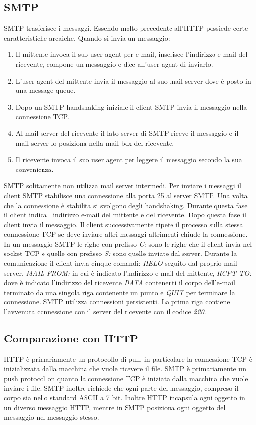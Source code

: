 \subsection{SMTP}
SMTP trasferisce i messaggi. Essendo molto precedente all'HTTP possiede certe caratteristiche arcaiche. Quando si invia un messaggio:
\begin{enumerate}
\item Il mittente invoca il suo user agent per e-mail, inserisce l'indirizzo e-mail del ricevente, compone un messaggio e dice all'user agent di inviarlo.
\item L'user agent del mittente invia il messaggio al suo mail server dove \`e posto in una message queue.
\item Dopo un SMTP handshaking iniziale il client SMTP invia il messaggio nella connessione TCP.
\item Al mail server del ricevente il lato server di SMTP riceve il messaggio e il mail server lo posiziona nella mail box del ricevente.
\item Il ricevente invoca il suo user agent per leggere il messaggio secondo la sua convenienza.
\end{enumerate}
SMTP solitamente non utilizza mail server intermedi. Per inviare i messaggi il client SMTP stabilisce una connessione alla porta 25 al server SMTP. Una volta che la connessione \`e stabilita si svolgono degli 
handshaking. Durante questa fase il client indica l'indirizzo e-mail del mittente e del ricevente. Dopo questa fase il client invia il messaggio. Il client successivamente ripete il processo sulla stessa connessione 
TCP se deve inviare altri messaggi altrimenti chiude la connessione. In un messaggio SMTP le righe con prefisso \emph{C:} sono le righe che il client invia nel socket TCP e quelle con prefisso \emph{S:} sono
quelle inviate dal server. Durante la comunicazione il client invia cinque comandi: \emph{HELO} seguito dal proprio mail server, \emph{MAIL FROM:} in cui \`e indicato l'indirizzo e-mail del mittente, 
\emph{RCPT TO:} dove \`e indicato l'indirizzo del ricevente \emph{DATA} contenenti il corpo dell'e-mail terminato da una singola riga contenente un punto e \emph{QUIT} per terminare la connessione. SMTP
utilizza connessioni persistenti. La prima riga contiene l'avvenuta connessione con il server del ricevente con il codice \emph{220}.
\subsection{Comparazione con HTTP}
HTTP \`e primariamente un protocollo di pull, in particolare la connessione TCP \`e inizializzata dalla macchina che vuole ricevere il file. SMTP \`e primariamente un push protocol on quanto la connessione TCP 
\`e iniziata dalla macchina che vuole inviare i file. SMTP inoltre richiede che ogni parte del messaggio, compreso il corpo sia nello standard ASCII a 7 bit. Inoltre HTTP incapsula ogni oggetto in un diverso
messaggio HTTP, mentre in SMTP posiziona ogni oggetto del messaggio nel messaggio stesso.
